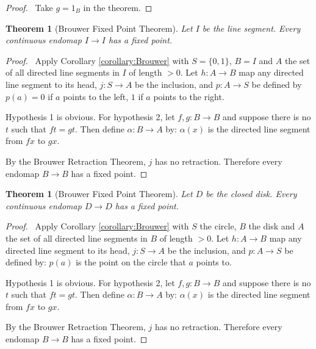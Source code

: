 \documentclass{article}
\let\qed\relax
\newtheorem{thm}[axiom]{Theorem}
\theoremstyle{definition}
\begin{document}
\begin{proof}
    \pf\ Take $g = 1_B$ in the theorem.
\end{proof}

\begin{thm}[Brouwer Fixed Point Theorem]
    Let $I$ be the line segment. Every continuous endomap $I \rightarrow I$ has a fixed point.
\end{thm}

\begin{proof}
    \pf\ Apply Corollary \ref{corollary:Brouwer} with $S = \{ 0,1 \}$, $B = I$ and $A$ the set of all
    directed line segments in $I$ of length $> 0$. Let $h : A \rightarrow B$ map any directed line segment to its head,
    $j : S \rightarrow A$ be the inclusion, and $p : A \rightarrow S$ be defined by $p(a) = 0$
    if $a$ points to the left, $1$ if $a$ points to the right.

    Hypothesis 1 is obvious. For hypothesis 2, let $f, g : B \rightarrow B$ and suppose there is no $t$
    such that $ft = gt$. Then define $\alpha : B \rightarrow A$ by: $\alpha(x)$ is the directed line segment
    from $fx$ to $gx$.

    By the Brouwer Retraction Theorem, $j$ has no retraction. Therefore every endomap $B \rightarrow B$
    has a fixed point. \qed
\end{proof}

\begin{thm}[Brouwer Fixed Point Theorem]
    Let $D$ be the closed disk. Every continuous endomap $D \rightarrow D$ has a fixed point.
\end{thm}

\begin{proof}
    \pf\ Apply Corollary \ref{corollary:Brouwer} with $S$ the circle, $B$ the disk and $A$ the set of all
    directed line segments in $B$ of length $> 0$. Let $h : A \rightarrow B$ map any directed line segment to
    its head,
    $j : S \rightarrow A$ be the inclusion, and $p : A \rightarrow S$ be defined by: $p(a)$ is the point on
    the circle that $a$ points to.

    Hypothesis 1 is obvious. For hypothesis 2, let $f, g : B \rightarrow B$ and suppose there is no $t$
    such that $ft = gt$. Then define $\alpha : B \rightarrow A$ by: $\alpha(x)$ is the directed line segment
    from $fx$ to $gx$.

    By the Brouwer Retraction Theorem, $j$ has no retraction. Therefore every endomap $B \rightarrow B$
    has a fixed point. \qed
\end{proof}
\end{document}
